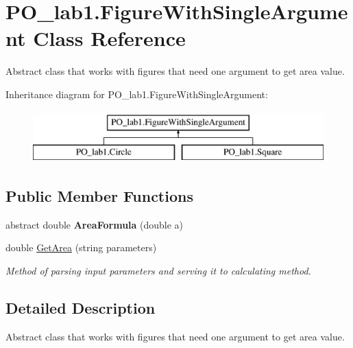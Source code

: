 \hypertarget{class_p_o__lab1_1_1_figure_with_single_argument}{}\section{P\+O\+\_\+lab1.\+Figure\+With\+Single\+Argument Class Reference}
\label{class_p_o__lab1_1_1_figure_with_single_argument}


Abstract class that works with figures that need one argument to get area value.  


Inheritance diagram for P\+O\+\_\+lab1.\+Figure\+With\+Single\+Argument\+:\begin{figure}[H]
\begin{center}
\leavevmode
\includegraphics[height=2.000000cm]{class_p_o__lab1_1_1_figure_with_single_argument}
\end{center}
\end{figure}
\subsection*{Public Member Functions}
\begin{DoxyCompactItemize}
\item 
\mbox{\label{class_p_o__lab1_1_1_figure_with_single_argument_af248bb28f2247a53ae5979d36ff8ec65}} 
abstract double {\bfseries Area\+Formula} (double a)
\item 
double \mbox{\hyperlink{class_p_o__lab1_1_1_figure_with_single_argument_a19718a035b0cc6930df33d05e4e0a92f}{Get\+Area}} (string parameters)
\begin{DoxyCompactList}\small\item\em Method of parsing input parameters and serving it to calculating method. \end{DoxyCompactList}\end{DoxyCompactItemize}


\subsection{Detailed Description}
Abstract class that works with figures that need one argument to get area value. 




